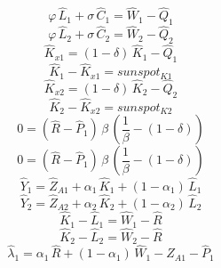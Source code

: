 \begin{dmath}
{{\varphi}}\, {{\hat{L}_{1}}}+{{\sigma}}\, {{\hat{C}_{1}}}={{\hat{W}_{1}}}-{{\hat{Q}_{1}}}
\end{dmath}
\begin{dmath}
{{\varphi}}\, {{\hat{L}_{2}}}+{{\sigma}}\, {{\hat{C}_{2}}}={{\hat{W}_{2}}}-{{\hat{Q}_{2}}}
\end{dmath}
\begin{dmath}
{{\hat{K}_{x1}}}=\left(1-{{\delta}}\right)\, {{\hat{K}_{1}}}-{{\hat{Q}_{1}}}
\end{dmath}
\begin{dmath}
{{\hat{K}_{1}}}-{{\hat{K}_{x1}}}={{sunspot_{K1}}}
\end{dmath}
\begin{dmath}
{{\hat{K}_{x2}}}=\left(1-{{\delta}}\right)\, {{\hat{K}_{2}}}-{{\hat{Q}_{2}}}
\end{dmath}
\begin{dmath}
{{\hat{K}_{2}}}-{{\hat{K}_{x2}}}={{sunspot_{K2}}}
\end{dmath}
\begin{dmath}
0=\left({{\hat{R}}}-{{\hat{P}_{1}}}\right)\, {{\beta}}\, \left(\frac{1}{{{\beta}}}-\left(1-{{\delta}}\right)\right)
\end{dmath}
\begin{dmath}
0=\left({{\hat{R}}}-{{\hat{P}_{1}}}\right)\, {{\beta}}\, \left(\frac{1}{{{\beta}}}-\left(1-{{\delta}}\right)\right)
\end{dmath}
\begin{dmath}
{{\hat{Y}_{1}}}={{\hat{Z}_{A1}}}+{{\alpha_{1}}}\, {{\hat{K}_{1}}}+\left(1-{{\alpha_{1}}}\right)\, {{\hat{L}_{1}}}
\end{dmath}
\begin{dmath}
{{\hat{Y}_{2}}}={{\hat{Z}_{A2}}}+{{\alpha_{2}}}\, {{\hat{K}_{2}}}+\left(1-{{\alpha_{2}}}\right)\, {{\hat{L}_{2}}}
\end{dmath}
\begin{dmath}
{{\hat{K}_{1}}}-{{\hat{L}_{1}}}={{\hat{W}_{1}}}-{{\hat{R}}}
\end{dmath}
\begin{dmath}
{{\hat{K}_{2}}}-{{\hat{L}_{2}}}={{\hat{W}_{2}}}-{{\hat{R}}}
\end{dmath}
\begin{dmath}
{{\hat{\lambda}_{1}}}={{\alpha_{1}}}\, {{\hat{R}}}+\left(1-{{\alpha_{1}}}\right)\, {{\hat{W}_{1}}}-{{\hat{Z}_{A1}}}-{{\hat{P}_{1}}}
\end{dmath}
